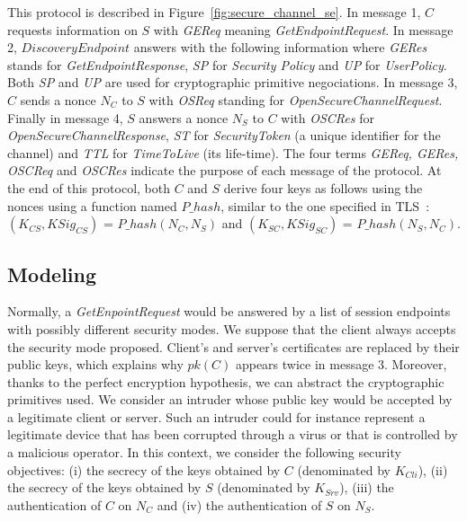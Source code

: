 This protocol is described in Figure~\ref{fig:secure_channel_se}.  In
message 1, $C$ requests information on $S$ with {\em GEReq} meaning
{\em GetEndpointRequest}.  In message 2, $DiscoveryEndpoint$ answers
with the following  information where {\em GERes} stands for {\em
  GetEndpointResponse}, {\em SP} for {\em Security Policy} and {\em
  UP} for {\em UserPolicy}.  Both {\em SP} and {\em UP} are used for
cryptographic primitive negociations.  In message 3, $C$ sends a nonce
 $N_{C}$ to $S$ with {\em OSReq} standing for {\em
  OpenSecureChannelRequest}.  Finally in message 4, $S$ answers a
nonce $N_{S}$ to $C$ with {\em OSCRes} for {\em
  OpenSecureChannelResponse}, {\em ST} for {\em SecurityToken} (a
unique identifier for the channel) and {\em TTL} for {\em TimeToLive}
(its life-time).  The four terms {\em GEReq, GERes, OSCReq} and {\em
  OSCRes} indicate the purpose of each message of the protocol.  At
the end of this protocol, both $C$ and $S$ derive four keys as follows using the
nonces using a function named $P\_hash$, similar to the one specified
in TLS~\cite{DR08}: $(K_{CS}, KSig_{CS})$ = $P\_hash(N_{C}, N_{S})$
and $(K_{SC}, KSig_{SC})$ = $P\_hash(N_{S}, N_{C})$.

\subsection{Modeling}\label{sec:secure_channel_modeling}

Normally, a {\em GetEnpointRequest} would be answered by a list of
session endpoints with possibly different security modes. We suppose
that the client always accepts the security mode proposed.  Client's
and server's certificates are replaced by their public keys, which
explains why $pk(C)$ appears twice in message 3.  Moreover, thanks to
the perfect encryption hypothesis, we can abstract the cryptographic
primitives used.  We consider an intruder whose public key would be
accepted by a legitimate client or server.  Such an intruder could for
instance represent a legitimate device that has been corrupted through
a virus or that is controlled by a malicious operator.
In this context, we consider the following security objectives: (i)
the secrecy of the keys obtained by $C$ (denominated by $K_{Cli}$), (ii) the
secrecy of the keys obtained by $S$ (denominated by $K_{Srv}$), (iii) the
authentication of $C$ on $N_{C}$ and (iv) the authentication of $S$ on $N_{S}$.

